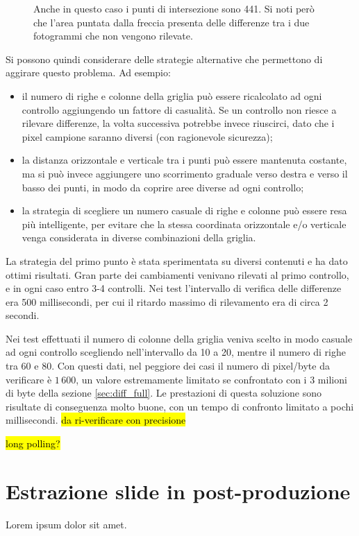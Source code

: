 \begin{figure}[htbp]
\begin{subfigure}[t]{0.5\textwidth}
	\end{subfigure}
	
	\caption{Anche in questo caso i punti di intersezione sono 441. Si noti però che l'area puntata dalla freccia presenta delle differenze tra i due fotogrammi che non vengono rilevate.}
	\label{fig:diff_slide2}
\end{figure}

Si possono quindi considerare delle strategie alternative che permettono di aggirare questo problema. Ad esempio:

\begin{itemize}
	\item il numero di righe e colonne della griglia può essere ricalcolato ad ogni controllo aggiungendo un fattore di casualità. Se un controllo non riesce a rilevare differenze, la volta successiva potrebbe invece riuscirci, dato che i pixel campione saranno diversi (con ragionevole sicurezza);
	\item la distanza orizzontale e verticale tra i punti può essere mantenuta costante, ma si può invece aggiungere uno scorrimento graduale verso destra e verso il basso dei punti, in modo da coprire aree diverse ad ogni controllo;
	\item la strategia di scegliere un numero casuale di righe e colonne può essere resa più intelligente, per evitare che la stessa coordinata orizzontale e/o verticale venga considerata in diverse combinazioni della griglia.
\end{itemize}

La strategia del primo punto è stata sperimentata su diversi contenuti e ha dato ottimi risultati. Gran parte dei cambiamenti venivano rilevati al primo controllo, e in ogni caso entro 3-4 controlli. Nei test l'intervallo di verifica delle differenze era 500 millisecondi, per cui il ritardo massimo di rilevamento era di circa 2 secondi.

Nei test effettuati il numero di colonne della griglia veniva scelto in modo casuale ad ogni controllo scegliendo nell'intervallo da 10 a 20, mentre il numero di righe tra 60 e 80. Con questi dati, nel peggiore dei casi il numero di pixel/byte da verificare è $1\,600$, un valore estremamente limitato se confrontato con i 3 milioni di byte della sezione \ref{sec:diff_full}. Le prestazioni di questa soluzione sono risultate di conseguenza molto buone, con un tempo di confronto limitato a pochi millisecondi. \hl{da ri-verificare con precisione}

\hl{long polling?}

\section{Estrazione slide in post-produzione}
\label{sec:diff_postprod}

Lorem ipsum dolor sit amet.

